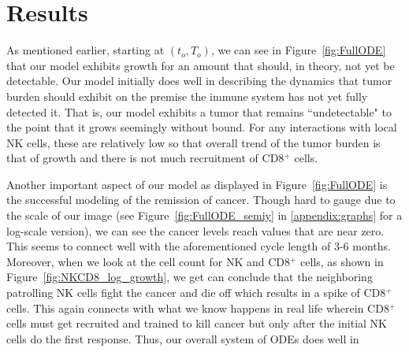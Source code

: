 \documentclass[11pt]{amsart}
\begin{document}
\section{Results}


As mentioned earlier, starting at $(t_o, T_o)$, we can see in Figure~\ref{fig:FullODE} that our model exhibits growth for an amount that should, in theory, not yet be detectable.
 Our model initially does well in describing the dynamics that tumor burden should exhibit on the premise the immune system has not yet fully detected it.
That is, our model exhibits a tumor that remains ``undetectable" to the point that it grows seemingly without bound.
For any interactions with local NK cells, these are relatively low so that overall trend of the tumor burden is that of growth and there is not much recruitment of CD8$^+$ cells.

Another important aspect of our model as displayed in Figure~\ref{fig:FullODE} is the successful modeling of the remission of cancer.
Though hard to gauge due to the scale of our image (see Figure~\ref{fig:FullODE_semiy} in \ref{appendix:graphs} for a log-scale version), we can see the cancer levels reach values that are near zero.
This seems to connect well with the aforementioned cycle length of 3-6 months.
Moreover, when we look at the cell count for NK and CD8$^+$ cells, as shown in Figure~\ref{fig:NKCD8_log_growth}, we get can conclude that the neighboring patrolling NK cells fight the cancer and die off which results in a spike of CD8$^+$ cells.
This again connects with what we know happens in real life wherein CD8$^+$ cells must get recruited and trained to kill cancer but only after the initial NK cells do the first response.
Thus, our overall system of ODEs does well in 
\end{document}
